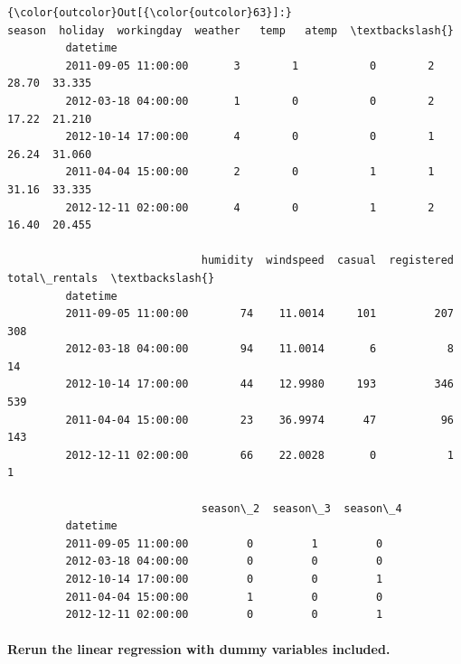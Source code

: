 \documentclass[11pt]{article}
\begin{document}
\begin{Verbatim}[commandchars=\\\{\}]
{\color{outcolor}Out[{\color{outcolor}63}]:}                      season  holiday  workingday  weather   temp   atemp  \textbackslash{}
         datetime                                                                   
         2011-09-05 11:00:00       3        1           0        2  28.70  33.335   
         2012-03-18 04:00:00       1        0           0        2  17.22  21.210   
         2012-10-14 17:00:00       4        0           0        1  26.24  31.060   
         2011-04-04 15:00:00       2        0           1        1  31.16  33.335   
         2012-12-11 02:00:00       4        0           1        2  16.40  20.455   
         
                              humidity  windspeed  casual  registered  total\_rentals  \textbackslash{}
         datetime                                                                      
         2011-09-05 11:00:00        74    11.0014     101         207            308   
         2012-03-18 04:00:00        94    11.0014       6           8             14   
         2012-10-14 17:00:00        44    12.9980     193         346            539   
         2011-04-04 15:00:00        23    36.9974      47          96            143   
         2012-12-11 02:00:00        66    22.0028       0           1              1   
         
                              season\_2  season\_3  season\_4  
         datetime                                           
         2011-09-05 11:00:00         0         1         0  
         2012-03-18 04:00:00         0         0         0  
         2012-10-14 17:00:00         0         0         1  
         2011-04-04 15:00:00         1         0         0  
         2012-12-11 02:00:00         0         0         1  
\end{Verbatim}
            
    \paragraph{Rerun the linear regression with dummy variables
included.}\label{rerun-the-linear-regression-with-dummy-variables-included.}
\end{document}
